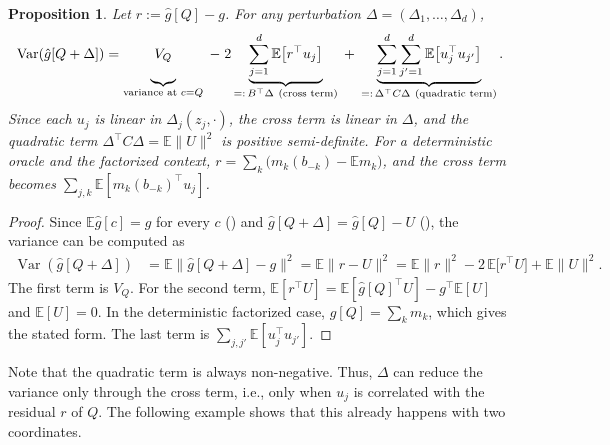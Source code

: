 \documentclass[10pt]{article}
\providecommand{\E}{\mathbb{E}}
\providecommand{\Var}{\operatorname{Var}}
\theoremstyle{plain}
\newtheorem{proposition}[theorem]{Proposition}
\theoremstyle{definition}
\theoremstyle{remark}
\theoremstyle{definition}
\newcommand{\ctx}[1]{z_{#1}}                 %
\newcommand{\ghat}[1]{\hat g[#1]}            %
\newcommand{\gtrue}{g}                       %
\newcommand{\VQ}{V_{Q}}
\begin{document}
\begin{proposition}\label{prop:quadratic}
    Let $r:=\ghat{Q}-\gtrue$. For any perturbation $\Delta=(\Delta_1,\dots,\Delta_d)$,
    \begin{align}\label{eq:ABC}
        \Var(\ghat{Q+\Delta}) = \underbrace{\vphantom{\sum_{j}}\VQ}_{\text{variance at }c=Q}
        \;-\;2\underbrace{\sum_{j=1}^{d}\E\big[r^{\top}u_j\big]}_{=:\,B^{\top}\Delta\ (\text{cross term})}
        \;+\;\underbrace{\sum_{j=1}^{d}\sum_{j'=1}^{d}\E\big[u_j^{\top}u_{j'}\big]}_{=:\,\Delta^{\top}C\Delta\ (\text{quadratic term})}.
    \end{align}
    Since each $u_j$ is linear in $\Delta_j(\ctx{j},\cdot)$, the cross term is linear in $\Delta$, and the quadratic term $\Delta^{\top}C\Delta=\E\|U\|^2$ is positive semi-definite. For a deterministic oracle and the factorized context, $r=\sum_k\big(m_k(b_{-k})-\E m_k\big)$, and the cross term becomes $\sum_{j,k}\E[m_k(b_{-k})^{\top}u_j]$.
\end{proposition}
\begin{proof}
    Since $\E\ghat{c}=\gtrue$ for every $c$ () and $\ghat{Q+\Delta}=\ghat{Q}-U$ (), the variance can be computed as
    \begin{align}
        \Var(\ghat{Q+\Delta}) &= \E\big\|\ghat{Q+\Delta}-\gtrue\big\|^2 = \E\big\|r - U\big\|^2
        =\E\|r\|^2 - 2\,\E\big[r^{\top}U\big] + \E\|U\|^2 .
    \end{align}
    The first term is $\VQ$. For the second term, $\E[r^{\top}U]=\E[\ghat{Q}^{\top}U]-\gtrue^{\top}\E[U]$ and $\E[U]=0$. In the deterministic factorized case, $\ghat{Q}=\sum_k m_k$, which gives the stated form. The last term is $\sum_{j,j'}\E[u_j^{\top}u_{j'}]$.
\end{proof}

Note that the quadratic term is always non-negative. Thus, $\Delta$ can reduce the variance only through the cross term, i.e., only when $u_j$ is correlated with the residual $r$ of $Q$. The following example shows that this already happens with two coordinates.
\end{document}

